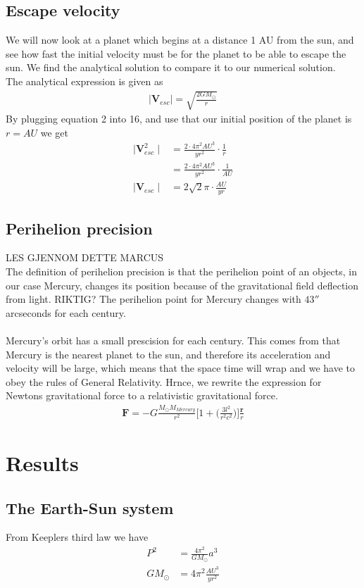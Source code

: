 \documentclass{article}
\begin{document}
\begin{multicols}{2}
\subsection{Escape velocity}
We will now look at a planet which begins at a distance 1 AU from the sun, 
and see how fast the initial velocity must be for the planet to be able to escape the sun. We find the analytical solution to compare it to our numerical solution. \\
The analytical expression is given as 
\begin{align}
    \mid{\mathbf{V}_{esc}}\mid=\sqrt{\frac{2GM_{\odot}}{r}}
\end{align}
By plugging equation 2 into 16, and use that our initial position of the planet is $r=AU$ we get
\begin{align}
\mid{\mathbf{V}_{esc}^2}\mid&=\frac{2\cdot 4\pi^2AU^3}{yr^2}\cdot\frac{1}{r}\\
&=\frac{2\cdot 4\pi^2AU^3}{yr^2}\cdot\frac{1}{AU}\\
\mid{\mathbf{V}_{esc}}\mid&=2\sqrt{2}\pi\cdot\frac{AU}{yr}
\end{align}
\subsection{Perihelion precision}
LES GJENNOM DETTE MARCUS\\
The definition of perihelion precision is that the perihelion point of an objects, in our case Mercury, changes its position because of 
the gravitational field deflection from light. RIKTIG? The perihelion point for Mercury changes with $43''$ arcseconds for each century. \\
\\
Mercury's orbit has a small prescision for each century. This comes from that Mercury is the nearest planet to the sun, and therefore its acceleration and velocity will be large, which means that the space time will wrap    and we have to obey the rules of General Relativity. Hrnce, we rewrite the expression for Newtons gravitational force to a relativistic gravitational force.
\begin{align}
    \mathbf{F}=-G\frac{M_{\odot}M_{Mercury}}{r^2}\Bigg[1+\Bigg(\frac{3l^2}{r^2c^2}\bigg)\bigg]\frac{\mathbf{r}}{r}
\end{align}

\section{Results}
\subsection{The Earth-Sun system}
From Keeplers third law we have
\begin{align}
    P^2&=\frac{4\pi^2}{GM_\odot}a^3\\
    GM_\odot&=4\pi^2\frac{AU^3}{yr^2}
\end{align}

\end{multicols}
\end{document}
